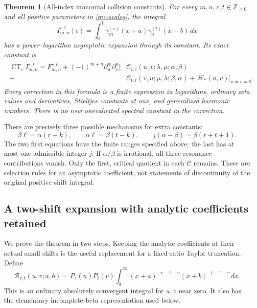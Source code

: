 \documentclass[11pt,a4paper]{article}
\numberwithin{equation}{section}
\newtheorem{theorem}{Theorem}[section]
\theoremstyle{definition}
\theoremstyle{remark}
\begin{document}
\begin{theorem}[All-index monomial collision constants]\label{mc:main}
For every $m,n,r,t\in\mathbb Z_{\ge0}$ and all positive parameters
in \eqref{mc:scales}, the integral
\[
 I_{m,n}^{r,t}(\epsilon)
   =\int_0^1\gamma_m^{(r)}(x+a)
                   \gamma_n^{(t)}(x+b)\,dx
\]
has a power--logarithm asymptotic expansion through its constant.
Its exact constant is
\begin{align}\label{mc:main-constant}
 \boxed{\begin{aligned}
 \operatorname{CT}_{\epsilon}I_{m,n}^{r,t}
  =F_{m,n}^{r,t}+(-1)^{m+n}\partial_u^m\partial_v^n
    \big[&\mathcal C_{r,t}(u,v;\lambda,\mu;\alpha,\beta)\\
       +&\mathcal C_{t,r}(v,u;\mu,\lambda;\beta,\alpha)
         +\mathcal H_*(u,v)\big]_{u=v=0}.
 \end{aligned}}
\end{align}
Every correction in this formula is a finite expression in
logarithms, ordinary zeta values and derivatives, Stieltjes constants
at one, and generalized harmonic numbers. There is no new
unevaluated spectral constant in the correction.
\end{theorem}

There are precisely three possible mechanisms for extra constants:
\begin{equation}\label{mc:three-mechanisms}
 \beta\ell=\alpha(r-k),\qquad
 \alpha\ell=\beta(t-k),\qquad
 j(\alpha-\beta)=\beta(r+t+1).
\end{equation}
The two first equations have the finite ranges specified above;
the last has at most one admissible integer $j$. If $\alpha/\beta$
is irrational, all three resonance contributions vanish. Only the
first, critical quotient in each $\mathcal C$ remains. These are
selection rules for an asymptotic coefficient, not statements of
discontinuity of the original positive-shift integral.

\subsection{A two-shift expansion with analytic coefficients retained}

We prove the theorem in two steps. Keeping the analytic coefficients
at their actual small shifts is the useful replacement for a
fixed-ratio Taylor truncation. Define
\begin{equation}\label{mc:kernel}
 \mathcal B_{r,t}(u,v;a,b)
  =P_r(u)P_t(v)\int_0^\infty
             (x+a)^{-r-1-u}(x+b)^{-t-1-v}\,dx.
\end{equation}
This is an ordinary absolutely convergent integral for $u,v$ near
zero. It also has the elementary incomplete-beta representation
used below.
\end{document}
